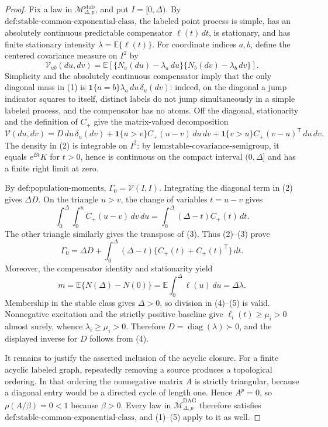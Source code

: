 \documentclass{article}
\begin{document}
\begin{proof}
Fix a law in \(\mathcal M_{\Delta,p}^{\mathrm{stab}}\), and put \(I=[0,\Delta)\).  By \(\text{def:stable-common-exponential-class}\), the labeled point process is simple, has an absolutely continuous predictable compensator \(\ell(t)\,dt\), is stationary, and has finite stationary intensity \(\lambda=\mathbb E\{\ell(t)\}\).  For coordinate indices \(a,b\), define the centered covariance measure on \(I^2\) by
\[
 \mathcal V_{ab}(du,dv)
 =\mathbb E\!\left[
   \{N_a(du)-\lambda_a\,du\}
   \{N_b(dv)-\lambda_b\,dv\}
 \right].
\tag{1}
\]
Simplicity and the absolutely continuous compensator imply that the only diagonal mass in (1) is
\(\mathbf 1\{a=b\}\lambda_a\,du\,\delta_u(dv)\): indeed, on the diagonal a jump indicator squares to itself, distinct labels do not jump simultaneously in a simple labeled process, and the compensator has no atoms.  Off the diagonal, stationarity and the definition of \(C_{+}\) give the matrix-valued decomposition
\[
 \mathcal V(du,dv)
 =D\,du\,\delta_u(dv)
  +\mathbf 1\{u>v\}C_{+}(u-v)\,du\,dv
  +\mathbf 1\{v>u\}C_{+}(v-u)^{\mathsf T}\,du\,dv.
\tag{2}
\]
The density in (2) is integrable on \(I^2\): by \(\text{lem:stable-covariance-semigroup}\), it equals \(e^{Bt}K\) for \(t>0\), hence is continuous on the compact interval \((0,\Delta]\) and has a finite right limit at zero.

By \(\text{def:population-moments}\), \(\Gamma_0=\mathcal V(I,I)\).  Integrating the diagonal term in (2) gives \(\Delta D\).  On the triangle \(u>v\), the change of variables \(t=u-v\) gives
\[
 \int_0^\Delta\!\int_0^u C_{+}(u-v)\,dv\,du
 =\int_0^\Delta(\Delta-t)C_{+}(t)\,dt.
\tag{3}
\]
The other triangle similarly gives the transpose of (3).  Thus (2)--(3) prove
\[
 \Gamma_0=\Delta D+\int_0^\Delta(\Delta-t)
 \{C_{+}(t)+C_{+}(t)^{\mathsf T}\}\,dt.
\tag{4}
\]
Moreover, the compensator identity and stationarity yield
\[
 m=\mathbb E\{N(\Delta)-N(0)\}
   =\mathbb E\!\int_0^\Delta\ell(u)\,du
   =\Delta\lambda.
\tag{5}
\]
Membership in the stable class gives \(\Delta>0\), so division in (4)--(5) is valid.  Nonnegative excitation and the strictly positive baseline give \(\ell_i(t)\geq\mu_i>0\) almost surely, whence \(\lambda_i\geq\mu_i>0\).  Therefore \(D=\operatorname{diag}(\lambda)\succ0\), and the displayed inverse for \(D\) follows from (4).

It remains to justify the asserted inclusion of the acyclic closure.  For a finite acyclic labeled graph, repeatedly removing a source produces a topological ordering.  In that ordering the nonnegative matrix \(A\) is strictly triangular, because a diagonal entry would be a directed cycle of length one.  Hence \(A^p=0\), so \(\rho(A/\beta)=0<1\) because \(\beta>0\).  Every law in \(\overline{\mathcal M}_{\Delta,p}^{\mathrm{DAG}}\) therefore satisfies \(\text{def:stable-common-exponential-class}\), and (1)--(5) apply to it as well.
\end{proof}
\end{document}
